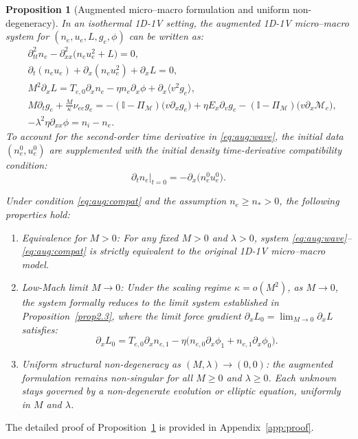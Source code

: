 \documentclass[pdflatex,final,10pt]{article}
\newtheorem{proposition}{Proposition}[section]
\newcommand{\Del}[1]{#1}
\begin{document}
\begin{proposition}[Augmented micro--macro formulation and \Del{uniform non-degeneracy}] \label{prop2.4}
In an isothermal 1D-1V setting, the augmented 1D-1V micro--macro system for $(n_e, u_e, L, g_e, \phi)$ can be written as:
\begin{align}
    &\partial^2_{tt} n_e - \partial^2_{xx} \big( n_e u_e^2 + L \big) = 0, \label{eq:aug:wave}\\
    &\partial_t (n_e u_e) + \partial_x (n_e u_e^2) + \partial_x L = 0, \label{eq:aug:2}\\
    &M^2 \partial_{x} L = T_{e,0} \partial_{x} n_e - \eta n_e \partial_x \phi + \partial_{x} \langle v^2 g_e \rangle, \label{eq:aug:3}\\
    &M \partial_t g_e + \frac{M}{\kappa} \nu_{ee} g_e = -(\mathbb{I} - \Pi_{\mathcal{M}})\big( v \partial_x g_e \big) + \eta E_x \partial_{v} g_e - (\mathbb{I} - \Pi_{\mathcal{M}})\big( v\partial_x \mathcal{M}_e \big), \label{eq:aug:4}\\
    &-\lambda^2 \eta \partial_{xx} \phi = n_i - n_e. \label{eq:aug:5}
\end{align}
To account for the second-order time derivative in \eqref{eq:aug:wave}, the initial data $(n_e^0, u_e^0)$ are supplemented with the initial density time-derivative compatibility condition:
\begin{equation} \label{eq:aug:compat}
    \left. \partial_t n_e \right|_{t=0} = -\partial_x \big( n_e^0 u_e^0 \big).
\end{equation}

Under condition \eqref{eq:aug:compat} and the assumption $n_e \ge n_\ast > 0$, the following properties hold:
\begin{enumerate}
    \item \emph{Equivalence for $M > 0$:} For any fixed $M > 0$ and $\lambda > 0$, system \eqref{eq:aug:wave}--\eqref{eq:aug:compat} is strictly equivalent to the original 1D-1V micro--macro model.
    \item \emph{Low-Mach limit $M \to 0$:} Under the scaling regime $\kappa = o(M^2)$, as $M \to 0$, the system formally reduces to the limit system established in Proposition~\ref{prop2.3}, where the limit force gradient $\partial_x L_0 = \lim_{M \to 0} \partial_x L$ satisfies:
    \begin{equation} \label{eq:L0_grad_def}
        \partial_x L_0 = T_{e,0} \partial_x n_{e,1} - \eta \big( n_{e,0} \partial_x \phi_1 + n_{e,1} \partial_x \phi_0 \big).
    \end{equation}
    \item \Del{\emph{Uniform structural non-degeneracy as $(M, \lambda) \to (0, 0)$:}  the augmented formulation remains non-singular for all $M \ge 0$ and $\lambda \ge 0$. Each unknown stays governed by a non-degenerate evolution or elliptic equation, uniformly in $M$ and $\lambda$}.
\end{enumerate}
\end{proposition}
The detailed proof of Proposition~\ref{prop2.4} is provided in Appendix~\ref{app:proof}.
\end{document}
